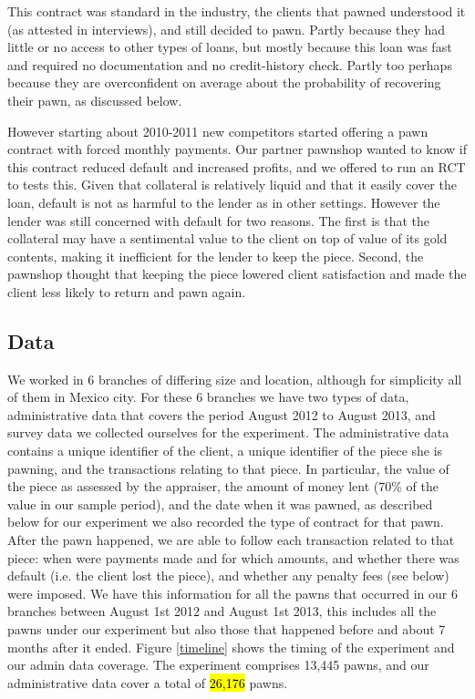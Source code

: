 \documentclass[11pt]{article}
\begin{document}
    This contract was standard in the industry, the clients that pawned understood it (as attested in interviews), and still decided to pawn. Partly because they had little or no access to other types of loans, but mostly because this loan was fast and required no documentation and no credit-history check. Partly too perhaps because they are overconfident on average about the probability of recovering their pawn, as discussed below.
    
    However starting about 2010-2011 new competitors started offering a pawn contract with forced monthly payments. Our partner pawnshop wanted to know if this contract reduced default and increased profits, and we offered to run an RCT to tests this. Given that collateral is relatively liquid and that it easily cover the loan, default is not as harmful to the lender as in other settings. However the lender was still concerned with default for two reasons. The first is that the collateral may have a sentimental value to the client on top of value of its gold contents, making it inefficient for the lender to keep the piece. Second, the pawnshop thought that keeping the piece lowered client satisfaction and made the client less likely to return and pawn again.
    
    
    \subsection{Data}
    
    We worked in 6 branches of differing size and location, although for simplicity all of them in Mexico city. For these 6 branches we have two types of data, administrative data that covers the period August 2012 to August 2013, and survey data we collected ourselves for the experiment. The administrative data contains a unique identifier of the client, a unique identifier of the piece she is pawning, and the transactions relating to that piece. In particular, the value of the piece as assessed by the appraiser, the amount of money lent (70\% of the value in our sample period), and the date when it was pawned, as described below for our experiment we also recorded the type of contract for that pawn.  After the pawn happened, we are able to follow each transaction related to that piece: when were payments made and for which amounts, and whether there was default (i.e. the client lost the piece), and whether any penalty fees (see below) were imposed. We have this information for all the pawns that occurred in our 6 branches between August 1st 2012 and August 1st 2013, this includes all the pawns under our experiment but also those that happened before and about 7 months after it ended. Figure \ref{timeline} shows the timing of the experiment and our admin data coverage. The experiment comprises 13,445 pawns, and our administrative data cover a total of \hl{26,176} pawns.
    
\end{document}
